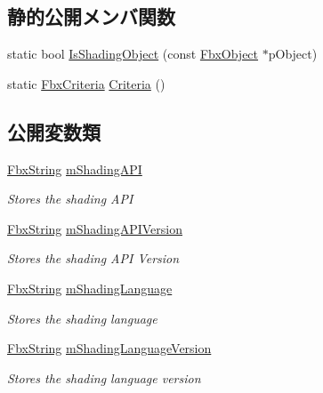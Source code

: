 \subsection*{静的公開メンバ関数}
\begin{DoxyCompactItemize}
\item 
static bool \hyperlink{class_fbx_implementation_filter_a3109594701842272e84f683f696d8e4b}{Is\+Shading\+Object} (const \hyperlink{class_fbx_object}{Fbx\+Object} $\ast$p\+Object)
\item 
static \hyperlink{class_fbx_criteria}{Fbx\+Criteria} \hyperlink{class_fbx_implementation_filter_a343590c07f9897b9cf8ceed11b979491}{Criteria} ()
\end{DoxyCompactItemize}
\subsection*{公開変数類}
\begin{DoxyCompactItemize}
\item 
\hyperlink{class_fbx_string}{Fbx\+String} \hyperlink{class_fbx_implementation_filter_afc2611e4f45d48ce02a04f98b7d84879}{m\+Shading\+A\+PI}
\begin{DoxyCompactList}\small\item\em Stores the shading A\+PI \end{DoxyCompactList}\item 
\hyperlink{class_fbx_string}{Fbx\+String} \hyperlink{class_fbx_implementation_filter_a7465e8dd2f78fe732b44c6f4d9d4c82d}{m\+Shading\+A\+P\+I\+Version}
\begin{DoxyCompactList}\small\item\em Stores the shading A\+PI Version \end{DoxyCompactList}\item 
\hyperlink{class_fbx_string}{Fbx\+String} \hyperlink{class_fbx_implementation_filter_a31657bd12d08884c56fc09d04a0e6843}{m\+Shading\+Language}
\begin{DoxyCompactList}\small\item\em Stores the shading language \end{DoxyCompactList}\item 
\hyperlink{class_fbx_string}{Fbx\+String} \hyperlink{class_fbx_implementation_filter_a4dd713756b9a134ef2a43dcf6cb2ae59}{m\+Shading\+Language\+Version}
\begin{DoxyCompactList}\small\item\em Stores the shading language version \end{DoxyCompactList}\end{DoxyCompactItemize}
